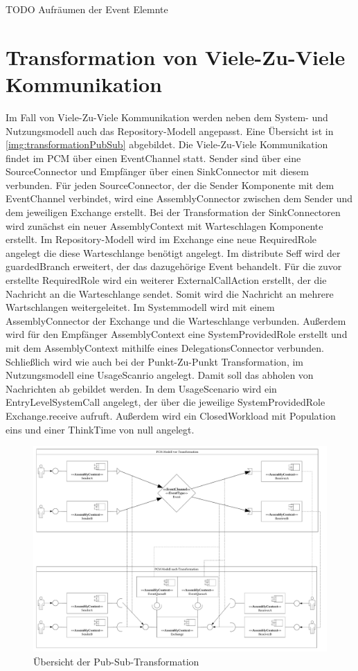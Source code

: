 TODO Aufräumen der Event Elemnte

\section{Transformation von Viele-Zu-Viele Kommunikation}
Im Fall von Viele-Zu-Viele Kommunikation werden neben dem System- und Nutzungsmodell auch das Repository-Modell angepasst. Eine Übersicht ist in \autoref{img:transformationPubSub} abgebildet. Die Viele-Zu-Viele Kommunikation findet im PCM über einen EventChannel statt. Sender sind über eine SourceConnector und Empfänger über einen SinkConnector mit diesem verbunden. Für jeden SourceConnector, der die Sender Komponente mit dem EventChannel verbindet, wird eine AssemblyConnector zwischen dem Sender und dem jeweiligen Exchange erstellt. Bei der Transformation der SinkConnectoren wird zunächst ein neuer AssemblyContext mit Warteschlagen Komponente erstellt. Im Repository-Modell wird im Exchange eine neue RequiredRole angelegt die diese Warteschlange benötigt angelegt. Im distribute Seff wird der guardedBranch erweitert, der das dazugehörige Event behandelt. Für die zuvor erstellte RequiredRole wird ein weiterer ExternalCallAction erstellt, der die Nachricht an die Warteschlange sendet. Somit wird die Nachricht an mehrere Wartschlangen weitergeleitet. Im Systemmodell wird mit einem AssemblyConnector der Exchange und die Warteschlange verbunden. Außerdem wird für den Empfänger AssemblyContext eine SystemProvidedRole erstellt und mit dem AssemblyContext mithilfe eines DelegationsConnector verbunden. Schließlich wird wie auch bei der Punkt-Zu-Punkt Transformation, im Nutzungsmodell eine UsageScanrio angelegt. Damit soll das abholen von Nachrichten ab gebildet werden. In dem UsageScenario wird ein EntryLevelSystemCall angelegt, der über die jeweilige SystemProvidedRole Exchange.receive aufruft. Außerdem wird ein ClosedWorkload mit Population eins und einer ThinkTime von null angelegt.

\begin{figure}
\center
  \includegraphics[width=1\textwidth]{images/transformation/transformationSystemPubSub.pdf}
  \caption{Übersicht der Pub-Sub-Transformation}
  \label{img:transformationPubSub}
\end{figure}

